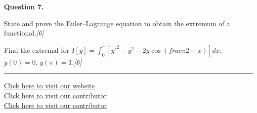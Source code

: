 \documentclass[11pt,a4paper]{article}
\newcommand{\pts}[1]{\hfill   \textit{[#1]}}
\begin{document}
\medskip


\noindent   \textbf{Question 7.}

\begin{parts}
  \item State and prove the Euler--Lagrange equation to obtain the extremum of a functional.\pts{6}
  \item Find the extremal for $I[y]=\displaystyle\int_0^\pi\!\left[y'^2-y^2-2y\cos\!\left( frac{\pi}{2}-x\right)\right]dx$, $y(0)=0$, $y(\pi)=1$.\pts{6}
\end{parts}

\vfill\rule{\linewidth}{0.4pt}

\begin{center}\small
\href{https://bhu-exam.vercel.app/}{Click here to visit our website}\\[4pt]
\href{https://me-aryan.vercel.app/}{Click here to visit our contributor}\\[4pt]
\href{https://quashan-me.vercel.app/}{Click here to visit our contributor}
\end{center}
\end{document}
